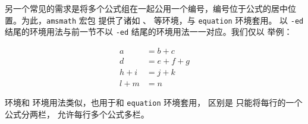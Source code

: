 另一个常见的需求是将多个公式组在一起公用一个编号，编号位于公式的居中位置。为此，\lstinline{amsmath} 宏包
提供了诸如 、 等环境，与 \lstinline{equation} 环境套用。
以 \texttt{-ed} 结尾的环境用法与前一节不以 \texttt{-ed} 结尾的环境用法一一对应。我们仅以  举例：

\begin{codeshow}
    \begin{equation}
        \begin{aligned}
            a     & = b + c     \\
            d     & = e + f + g \\
            h + i & = j + k     \\
            l + m & = n
        \end{aligned}
    \end{equation}
\end{codeshow}

 环境和  环境用法类似，也用于和 \lstinline{equation} 环境套用，
区别是  只能将每行的一个公式分两栏， 允许每行多个公式多栏。









\section{}